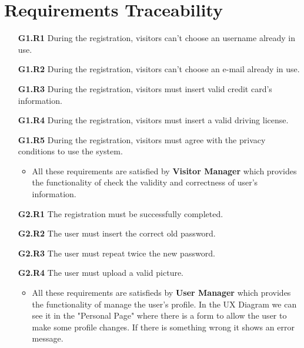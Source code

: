 \section{Requirements Traceability} \label{sec:req-trac}


\begin{itemize}
\item[\textbf{G1.R1}] During the registration, visitors can't choose an username already in use.
\item[\textbf{G1.R2}] During the registration, visitors can't choose an e-mail already in use.
\item[\textbf{G1.R3}] During the registration, visitors must insert valid credit card's information.
\item[\textbf{G1.R4}] During the registration, visitors must insert a valid driving license.
\item[\textbf{G1.R5}] During the registration, visitors must agree with the privacy conditions to use the system.
\begin{itemize}
\item All these requirements are satisfied by \textbf{Visitor Manager} which provides the functionality of check the validity and correctness of user's information.
\end{itemize}

\item[\textbf{G2.R1}] The registration must be successfully completed.
\item[\textbf{G2.R2}] The user must insert the correct old password.
\item[\textbf{G2.R3}] The user must repeat twice the new password.
\item[\textbf{G2.R4}] The user must upload a valid picture.
\begin{itemize}
\item All these requirements are satisfieds by \textbf{User Manager} which provides the functionality of manage the user's profile. In the UX Diagram we can see it in the "Personal Page" where there is a form to allow the user to make some profile changes. If there is something wrong it shows an error message.
\end{itemize}


\end{itemize}
